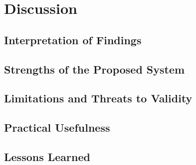 \chapter{Discussion}
\label{cha:discussion}

\section{Interpretation of Findings}

\section{Strengths of the Proposed System}

\section{Limitations and Threats to Validity}

\section{Practical Usefulness}

\section{Lessons Learned}
